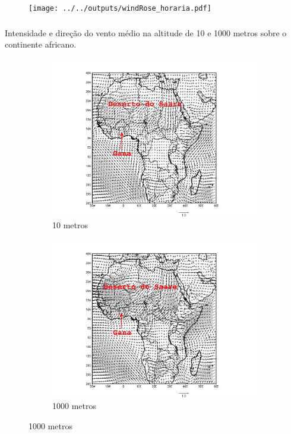 \begin{frame}
	\frametitle{}
	\begin{figure}[H]
		\centering
		\texttt{[image: ../../outputs/windRose\_horaria.pdf]}
	\end{figure}
\end{frame}


\begin{frame}
\frametitle{}
Intensidade e direção do vento médio na altitude de 
10 e 1000 metros sobre o continente africano.
\begin{figure}[H]
\centering
  \begin{subfigure}[b]{0.5\linewidth}
    \includegraphics[width=\linewidth]{../../inputs/grads/gimp/1000hPa/JAN_2008.pdf}
    \caption{10 metros}
  \end{subfigure}%
  \begin{subfigure}[b]{0.5\linewidth}
    \includegraphics[width=\linewidth]{../../inputs/grads/gimp/875hPa/JAN_2008.pdf}
    \caption{1000 metros}
  \end{subfigure}
\end{figure}
\end{frame}

